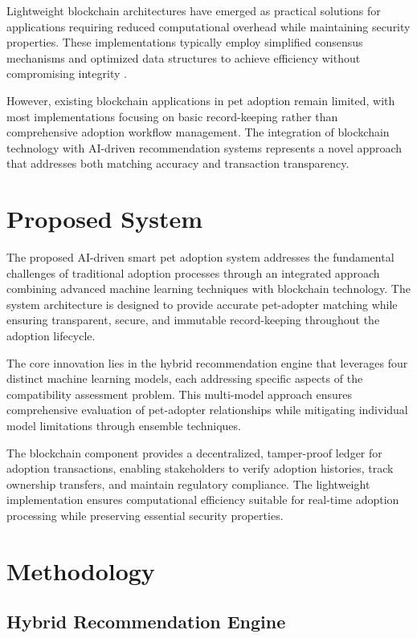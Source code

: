 \documentclass[conference]{IEEEtran}
\begin{document}
Lightweight blockchain architectures have emerged as practical solutions for applications requiring reduced computational overhead while maintaining security properties. These implementations typically employ simplified consensus mechanisms and optimized data structures to achieve efficiency without compromising integrity \cite{lightweight2023}.

However, existing blockchain applications in pet adoption remain limited, with most implementations focusing on basic record-keeping rather than comprehensive adoption workflow management. The integration of blockchain technology with AI-driven recommendation systems represents a novel approach that addresses both matching accuracy and transaction transparency.

\section{Proposed System}

The proposed AI-driven smart pet adoption system addresses the fundamental challenges of traditional adoption processes through an integrated approach combining advanced machine learning techniques with blockchain technology. The system architecture is designed to provide accurate pet-adopter matching while ensuring transparent, secure, and immutable record-keeping throughout the adoption lifecycle.

The core innovation lies in the hybrid recommendation engine that leverages four distinct machine learning models, each addressing specific aspects of the compatibility assessment problem. This multi-model approach ensures comprehensive evaluation of pet-adopter relationships while mitigating individual model limitations through ensemble techniques.

The blockchain component provides a decentralized, tamper-proof ledger for adoption transactions, enabling stakeholders to verify adoption histories, track ownership transfers, and maintain regulatory compliance. The lightweight implementation ensures computational efficiency suitable for real-time adoption processing while preserving essential security properties.

\section{Methodology}

\subsection{Hybrid Recommendation Engine}
\end{document}
